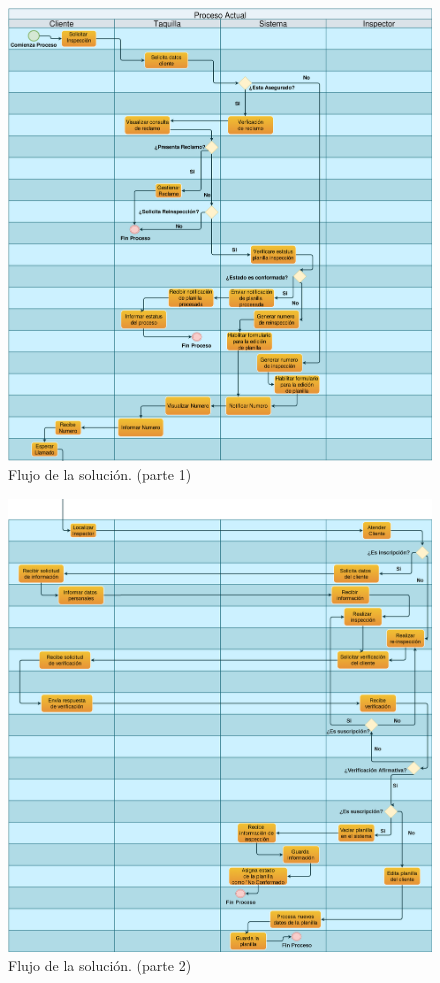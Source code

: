 \begin{figure}[H]
\begin{center}
	\includegraphics[width=\textwidth]{img/p1.png}
\end{center}
\caption{Flujo de la solución. (parte 1)}
\label{fig:proc_con_sistema_1}
\end{figure}

\newpage
\begin{figure}[H]
\begin{center}
	\includegraphics[width=\textwidth]{img/p2.png}
\end{center}
\caption{Flujo de la solución. (parte 2)}
\label{fig:proc_con_sistema_2}
\end{figure}

